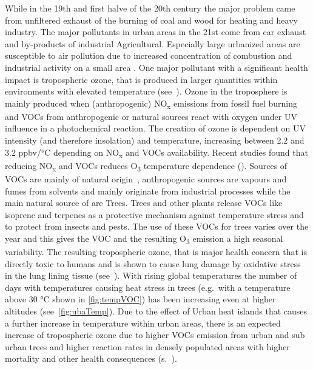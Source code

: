 \documentclass[12pt,a4paper, english]{article}
\begin{document}
      While in the 19th and first halve of the 20th century the major problem came from unfiltered exhaust of the burning of coal and wood for heating and heavy industry.
      The major pollutants in urban areas in the 21st come from car exhaust and by-products of industrial Agricultural. %
      Especially large urbanized areas are susceptible to air pollution due to increased concentration of combustion and industrial activity on a small area \autocite{Kanakidou2011}.
      One major pollutant with a significant health impact is tropospheric ozone, that is produced in larger quantities within environments with elevated temperature (see~\cite{Ebi2008}). 
      Ozone in the troposphere is mainly produced when (anthropogenic) NO\textsubscript{x} emissions from fossil fuel burning and \glspl{VOC} from anthropogenic or natural sources react with oxygen under UV influence in a photochemical reaction.  
      The creation of ozone is dependent on UV intensity (and therefore insolation) and temperature, increasing between 2.2 and 3.2 ppbv/°C depending on NO\textsubscript{x} and \glspl{VOC} availability. 
      Recent studies found that reducing NO\textsubscript{x} and \glspl{VOC} reduces O\textsubscript{3} temperature dependence (\autocite{Otero2021}).
      Sources of \glspl{VOC} are mainly of natural origin~\autocite{Kansal2009}, anthropogenic sources are vapours and fumes from solvents and mainly originate from industrial processes while the main natural source of  are Trees.
      Trees and other plants release VOCs like isoprene and terpenes as a protective mechanism against temperature stress and to protect from insects and pests. 
      The use of these \glspl{VOC} for trees varies over the year and this gives the \gls{VOC} and the resulting O\textsubscript{3} emission a high seasonal variability. 
      The resulting tropospheric ozone, that is major health concern that is directly toxic to humans and is shown to cause lung damage by oxidative stress in the lung lining tissue (see~\autocite{Mudway2000}). 
      With rising global temperatures the number of days with temperatures causing heat stress in trees (e.g.\ with a temperature above 30 °C shown in \cref{fig:tempVOC}) has been increasing even at higher altitudes (see~\cref{fig:ubaTemp}).
      Due to the effect of Urban heat islands that causes a further increase in temperature within urban areas, there is an expected increase of tropospheric ozone due to higher \glspl{VOC} emission from urban and sub urban trees and higher reaction rates in densely populated areas with higher mortality and other health consequences (s.~\autocite{Ebi2008}).\\
      
\end{document}
